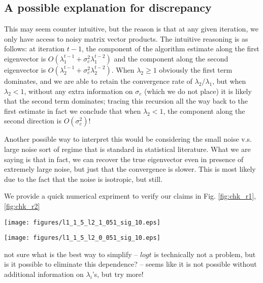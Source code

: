 \documentclass[10pt]{article}
\begin{document}
{\color{teal} 
\subsection{A possible explanation for discrepancy}\label{sec:expl}
This may seem counter intuitive, but the reason is that at any given iteration, we only have access to noisy matrix vector products. The intuitive reasoning is as follows: at iteration $t-1$, the component of the algorithm estimate along the first eigenvector is $O( \lambda_1^{t-1} + \sigma_c^2 \lambda_1^{t-2})$ and the component along the second eigenvector is $O( \lambda_2^{t-1} + \sigma_c^2 \lambda_2^{t-2})$. When $\lambda_2 \geq 1$ obviously the first term dominates, and we are able to retain the convergence rate of $\lambda_2/\lambda_1$, but when $\lambda_2 <1$, without any extra information on $\sigma_c$ (which we do not place) it is likely that the second term dominates; tracing this recursion all the way back to the first estimate in fact we conclude that when $\lambda_2 < 1$, the component along the second direction is $O(\sigma_c^2)$! 

Another possible way to interpret this would be considering the small noise v.s. large noise sort of regime that is standard in statistical literature. What we are saying is that in fact, we can recover the true eigenvector even in presence of extremely large noise, but just that the convergence is slower. This is most likely due to the fact that the noise is isotropic, but still. 

We provide a quick numerical expriment to verify our claims in Fig. \ref{fig:chk_r1}, \ref{fig:chk_r2}

\begin{minipage}[t]{.5\linewidth}
\centering
\texttt{[image: figures/l1\_1\_5\_l2\_1\_051\_sig\_10.eps]}
\label{fig:chk_r1}
\end{minipage}%
\begin{minipage}[t]{.5\linewidth}
\centering
\texttt{[image: figures/l1\_1\_5\_l2\_0\_051\_sig\_10.eps]}
\label{fig:chk_r2}
\end{minipage}
}


{\noindent \color{blue} not sure what is the best way to simplify -- $log t$ is technically not a problem, but is it possible to eliminate this dependence? -- seems like it is not possible without additional information on $\lambda_i$'s, but try more!}
\end{document}
